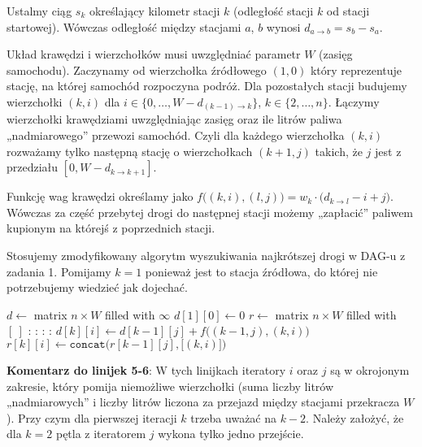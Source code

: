 \documentclass[14pt]{article}
\begin{document}
Ustalmy ciąg $s_k$ określający kilometr stacji $k$ (odległość stacji $k$ od stacji startowej).
Wówczas odległość między stacjami $a$, $b$ wynosi $d_{a\to b} = s_b - s_a$.

Układ krawędzi i wierzchołków musi uwzględniać parametr $W$ (zasięg samochodu).
Zaczynamy od wierzchołka źródłowego $(1,0)$ który reprezentuje stację, na której samochód rozpoczyna podróż. Dla pozostałych stacji budujemy wierzchołki $(k,i)$ dla $i\in\{0,\dots,W-d_{(k-1)\to k}\}$, $k\in\{2,\dots,n\}$.
Łączymy wierzchołki krawędziami uwzględniając zasięg oraz ile litrów paliwa „nadmiarowego” przewozi samochód. Czyli dla każdego wierzchołka $(k,i)$ rozważamy tylko następną stację o wierzchołkach $(k+1,j)$ takich, że $j$ jest z przedziału $[0, W-d_{k\to k+1}]$.

Funkcję wag krawędzi określamy jako $f\big((k,i),(l,j)\big)=w_k\cdot\big(d_{k\to l} - i + j \big)$. Wówczas za część przebytej drogi do następnej stacji możemy „zapłacić” paliwem kupionym na którejś z poprzednich stacji.

Stosujemy zmodyfikowany algorytm wyszukiwania najkrótszej drogi w DAG-u z zadania 1. Pomijamy $k=1$ ponieważ jest to stacja źródłowa, do której nie potrzebujemy wiedzieć jak dojechać.

\begin{algorithm}[H]
  \begin{algorithmic}[1]
    \State $d \gets$ matrix $n \times W$ filled with $\infty$
    \State $d[1][0] \gets 0$
    \State $r \gets$ matrix $n \times W$ filled with $[~]$
    :
      :
        :
          :
            \State $d[k][i] \gets d[k-1][j] + f\big((k-1,j),(k,i)\big)$
            \State $r[k][i] \gets \texttt{concat}\Big(r[k-1][j], \big[ (k,i) \big]\Big)$
          \EndIf
        \EndFor
      \EndFor
    \EndFor
  \end{algorithmic}
\end{algorithm}

\textbf{Komentarz do linijek 5-6}: W tych linijkach iteratory $i$ oraz $j$ są w okrojonym zakresie, który pomija niemożliwe wierzchołki (suma liczby litrów „nadmiarowych” i liczby litrów liczona za przejazd między stacjami przekracza $W$). Przy czym dla pierwszej iteracji $k$ trzeba uważać na $k-2$. Należy założyć, że dla $k=2$ pętla z iteratorem $j$ wykona tylko jedno przejście.
\end{document}
